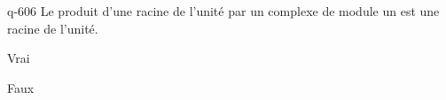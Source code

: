 \begin{truefalse}{q-606}
Le produit d'une racine de l'unité par un complexe de module un est une racine de l'unité.
\item Vrai
\item* Faux
\end{truefalse}

